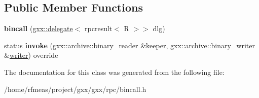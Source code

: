 \subsection*{Public Member Functions}
\begin{DoxyCompactItemize}
\item 
{\bfseries bincall} (\hyperlink{classgxx_1_1delegate}{gxx\+::delegate}$<$ rpcresult$<$ R $>$$>$ dlg)\hypertarget{classgxx_1_1rpc_1_1bincall_3_01gxx_1_1delegate_3_01rpcresult_3_01R_01_4_01_4_01_4_a6d37f5aa305b2b1ff57baa06379cc2cd}{}\label{classgxx_1_1rpc_1_1bincall_3_01gxx_1_1delegate_3_01rpcresult_3_01R_01_4_01_4_01_4_a6d37f5aa305b2b1ff57baa06379cc2cd}

\item 
status {\bfseries invoke} (gxx\+::archive\+::binary\+\_\+reader \&keeper, gxx\+::archive\+::binary\+\_\+writer \&\hyperlink{classgxx_1_1writer}{writer}) override\hypertarget{classgxx_1_1rpc_1_1bincall_3_01gxx_1_1delegate_3_01rpcresult_3_01R_01_4_01_4_01_4_ae978cb5bffe2eb887007ea3b27c5efda}{}\label{classgxx_1_1rpc_1_1bincall_3_01gxx_1_1delegate_3_01rpcresult_3_01R_01_4_01_4_01_4_ae978cb5bffe2eb887007ea3b27c5efda}

\end{DoxyCompactItemize}


The documentation for this class was generated from the following file\+:\begin{DoxyCompactItemize}
\item 
/home/rfmeas/project/gxx/gxx/rpc/bincall.\+h\end{DoxyCompactItemize}
